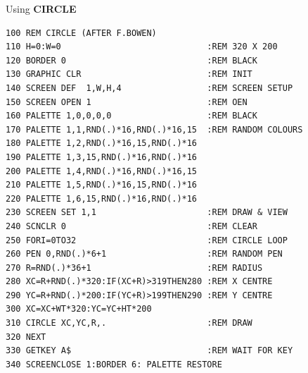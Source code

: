 \begin{description}[leftmargin=2cm,style=nextline]
\item [Example:] Using {\bf CIRCLE}
\begin{tcolorbox}[colback=black,coltext=white]
\verbatimfont{\codefont}
\begin{verbatim}
100 REM CIRCLE (AFTER F.BOWEN)
110 H=0:W=0                             :REM 320 X 200
120 BORDER 0                            :REM BLACK
130 GRAPHIC CLR                         :REM INIT
140 SCREEN DEF  1,W,H,4                 :REM SCREEN SETUP
150 SCREEN OPEN 1                       :REM OEN
160 PALETTE 1,0,0,0,0                   :REM BLACK
170 PALETTE 1,1,RND(.)*16,RND(.)*16,15  :REM RANDOM COLOURS
180 PALETTE 1,2,RND(.)*16,15,RND(.)*16
190 PALETTE 1,3,15,RND(.)*16,RND(.)*16
200 PALETTE 1,4,RND(.)*16,RND(.)*16,15
210 PALETTE 1,5,RND(.)*16,15,RND(.)*16
220 PALETTE 1,6,15,RND(.)*16,RND(.)*16
230 SCREEN SET 1,1                      :REM DRAW & VIEW
240 SCNCLR 0                            :REM CLEAR
250 FORI=0TO32                          :REM CIRCLE LOOP
260 PEN 0,RND(.)*6+1                    :REM RANDOM PEN
270 R=RND(.)*36+1                       :REM RADIUS
280 XC=R+RND(.)*320:IF(XC+R)>319THEN280 :REM X CENTRE
290 YC=R+RND(.)*200:IF(YC+R)>199THEN290 :REM Y CENTRE
300 XC=XC+WT*320:YC=YC+HT*200
310 CIRCLE XC,YC,R,.                    :REM DRAW
320 NEXT
330 GETKEY A$                           :REM WAIT FOR KEY
340 SCREENCLOSE 1:BORDER 6: PALETTE RESTORE
\end{verbatim}
\end{tcolorbox}
\end{description}


\newpage
